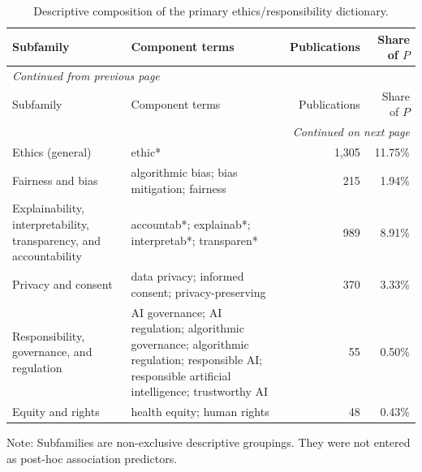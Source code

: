 \documentclass[11pt]{article}
\begin{document}
\begin{longtable}{p{5.0cm}p{5.4cm}rr}
\caption{Descriptive composition of the primary ethics/responsibility dictionary.}\label{tab:s6-ethics-composition}\\
\toprule
Subfamily & Component terms & Publications & Share of $P$ \\
\midrule
\endfirsthead
\multicolumn{4}{l}{\small\itshape Continued from previous page} \\
\toprule
Subfamily & Component terms & Publications & Share of $P$ \\
\midrule
\endhead
\midrule
\multicolumn{4}{r}{\small\itshape Continued on next page} \\
\endfoot
\bottomrule
\endlastfoot
Ethics (general) & ethic* & 1,305 & 11.75\% \\
Fairness and bias & algorithmic bias; bias mitigation; fairness & 215 & 1.94\% \\
Explainability, interpretability, transparency, and accountability & accountab*; explainab*; interpretab*; transparen* & 989 & 8.91\% \\
Privacy and consent & data privacy; informed consent; privacy-preserving & 370 & 3.33\% \\
Responsibility, governance, and regulation & AI governance; AI regulation; algorithmic governance; algorithmic regulation; responsible AI; responsible artificial intelligence; trustworthy AI & 55 & 0.50\% \\
Equity and rights & health equity; human rights & 48 & 0.43\% \\
\end{longtable}

\noindent\small Note: Subfamilies are non-exclusive descriptive groupings. They were not entered as post-hoc association predictors.
\end{document}
